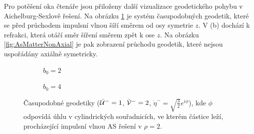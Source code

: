 Pro potěšení oka čtenáře jsou přiloženy další vizualizace geodetického pohybu v Aichelburg-Sexlově řešení. Na obrázku \ref{fig:AsMatter02} je systém časupodobných geodetik, které se před
průchodem impulsní vlnou šíří směrem od osy symetrie $z$. V (b) dochází k refrakci, která otáčí směr šíření směrem zpět k ose $z$.
Na obrázku \ref{fig:AsMatterNonAxial} je pak zobrazení průchodu geodetik, které nejsou uspořádány axiálně symetricky.

\begin{figure}[ht]
    \centering
    \begin{subfigure}[b]{0.45\textwidth}
        \caption{$b_0 = 2$}
    \end{subfigure}
    \hfill
    \begin{subfigure}[b]{0.45\textwidth}
        \caption{$b_0 = 4$}
    \end{subfigure}
    \caption{Časupodobné geodetiky ($\dot {\mathcal{U}}^-=1$, $\dot {\mathcal{V}}^-=2$, $\dot \eta^-=\sqrt{\frac{3}{2}} e^{i \phi}$), kde $\phi$ odpovídá úhlu v
    cylindrických souřadnicích, ve kterém částice leží, procházející impulsní vlnou AS řešení v $\rho=2$.}
    \label{fig:AsMatter02}
\end{figure}

